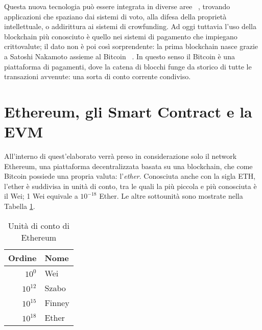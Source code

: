 \indent Questa nuova tecnologia può essere integrata in diverse aree ~\cite{iansiti_lakhani_2017}, trovando applicazioni che spaziano dai sistemi di voto, alla difesa della proprietà intellettuale, o addirittura ai sistemi di crowfunding. Ad oggi tuttavia l'uso della blockchain più conosciuto è quello nei sistemi di pagamento che impiegano crittovalute; il dato non è poi così sorprendente: la prima blockchain nasce grazie a Satoshi Nakamoto assieme al Bitcoin ~\cite{nakamoto2008bitcoin}. In questo senso il Bitcoin è una piattaforma di pagamenti, dove la catena di blocchi funge da storico di tutte le transazioni avvenute: una sorta di conto corrente condiviso.\newline




\section{Ethereum, gli Smart Contract e la EVM}

All'interno di quest'elaborato verrà preso in considerazione solo il network Ethereum, una piattaforma decentralizzata basata su una blockchain, che come Bitcoin possiede una propria valuta: l'\textit{ether}. Conosciuta anche con la sigla ETH, l'ether è suddivisa in unità di conto, tra le quali la più piccola e più conosciuta è il Wei; 1 Wei equivale a $10^{-18}$ Ether. Le altre sottounità sono mostrate nella Tabella \ref{tab:eth-units}.

\begin{table}[h]                        
\begin{center}  
\begin{tabular}{rl}
    \hline \hline   %
    Ordine & Nome\\
    \hline  %
    $10^0$ & Wei\\
    $10^{12}$ & Szabo\\
    $10^{15}$ & Finney\\
    $10^{18}$ & Ether\\
    \hline \hline
\end{tabular}
\caption[Unità di conto di Ethereum]{Unità di conto di Ethereum}\label{tab:eth-units}
\end{center}
\end{table}


